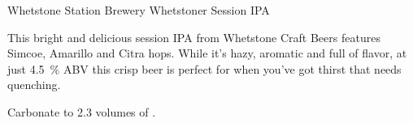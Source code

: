 \begin{recipie}{Whetstone Station Brewery Whetstoner Session IPA}

\begin{aboutblock}
This bright and delicious session IPA from Whetstone Craft Beers features Simcoe,
Amarillo and Citra hops. While it's hazy, aromatic and full of flavor, at just 4.5~\% ABV
this crisp beer is perfect for when you've got thirst that needs quenching.
\end{aboutblock}


\begin{methodandtiming}
 
\begin{mashsteps}
\end{mashsteps}

\begin{fermentationsteps}
\end{fermentationsteps}

\begin{directions}
Carbonate to 2.3 volumes of .
\end{directions}

\end{methodandtiming}

\pagebreak

\begin{ingredientsblock}

\begin{malts}
\end{malts}

\begin{hops}
\end{hops}

\begin{yeasts}
\end{yeasts}

\end{ingredientsblock}

\end{recipie}

